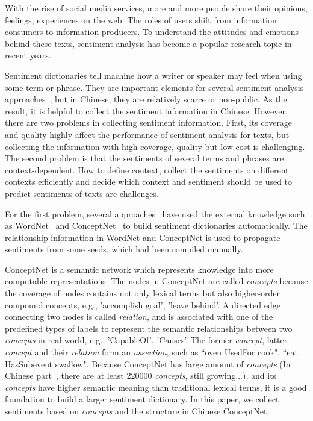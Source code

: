 With the rise of social media services, more and more people share their opinions, feelings, experiences on the web. The roles of users shift from information consumers to information producers. To understand the attitudes and emotions behind these texts, sentiment analysis has become a popular research topic in recent years. 

Sentiment dictionaries tell machine how a writer or speaker may feel when using some term or phrase. They are important elements for several sentiment analysis approaches~\cite{Taboada:lexiconBased11, Rao:WWW14, Wen:AAAI14, Lee:IJCNLP2011}, but in Chinese, they are relatively scarce or non-public. As the result, it is helpful to collect the sentiment information in Chinese. However, there are two problems in collecting sentiment information. First, its coverage and quality highly affect the performance of sentiment analysis for texts, but collecting the information with high coverage, quality but low cost is challenging. The second problem is that the sentiments of several terms and phrases are context-dependent. How to define context, collect the sentiments on different contexts efficiently and decide which context and sentiment should be used to predict sentiments of texts are challenges.

For the first problem, several approaches~\cite{Strapparava:IREC04, Esuli:LREC06, Liu:IUI03, Cambria:AAAI10, Wu:TAAI11, Tsai:IEEE13, Wu:relSelect14} have used the external knowledge such as WordNet~\cite{Miller:WordNet95} and ConceptNet~\cite{Havasi:RANLP07,Speer:LREC12} to build sentiment dictionaries automatically. The relationship information in WordNet and ConceptNet is used to propagate sentiments from some seeds, which had been compiled manually. 

ConceptNet is a semantic network which represents knowledge into more computable representations. The nodes in ConceptNet are called {\it concepts} because the coverage of nodes contains not only lexical terms but also higher-order compound concepts, e.g., 'accomplish goal', 'leave behind'. A directed edge connecting two nodes is called {\it relation}, and is associated with one of the predefined types of labels to represent the semantic relationships between two {\it concepts} in real world, e.g., 'CapableOf', 'Causes'. The former {\it concept}, latter {\it concept} and their {\it relation} form an {\it assertion}, such as ``oven UsedFor cook", ``eat HasSubevent swallow". Because ConceptNet has large amount of {\it concepts} (In Chinese part~\cite{Kuo:HCOMP09,Kuo:FSS10}, there are at least 220000 {\it concepts}, still growing...), and its {\it concepts} have higher semantic meaning than traditional lexical terms, it is a good foundation to build a larger sentiment dictionary. In this paper, we collect sentiments based on {\it concepts} and the structure in Chinese ConceptNet.

